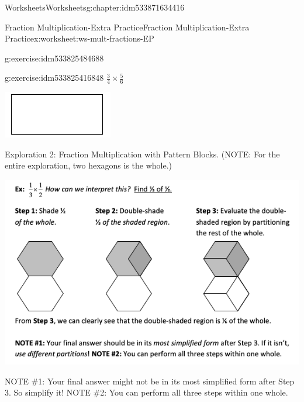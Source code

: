 \documentclass[twoside,11pt,]{book}
\begin{document}
\begin{chapterptx}{Worksheets}{}{Worksheets}{}{}{g:chapter:idm533871634416}
\begin{worksheet-section-numberless}{Fraction Multiplication-Extra Practice}{}{Fraction Multiplication-Extra Practice}{}{}{x:worksheet:ws-mult-fractions-EP}
\begin{divisionexercise}{1}{}{}{g:exercise:idm533825484688}
\begin{sidebyside}{1}{0.2}{0.2}{0}
\end{sidebyside}%
\end{divisionexercise}%
\clearpage
\begin{divisionexercise}{2}{}{}{g:exercise:idm533825416848}%
\(\frac{3}{4} \times \frac{5}{6} \)%
\begin{sidebyside}{1}{0.2}{0.2}{0}%
\begin{sbspanel}{0.6}%
\includegraphics[width=1\linewidth]{images/generic-rectangle.png}
\end{sbspanel}%
\end{sidebyside}%
\end{divisionexercise}%
\clearpage
\begin{introduction}{}%
Exploration 2: Fraction Multiplication with Pattern Blocks. (NOTE: For the entire exploration, two hexagons is the whole.)%
\begin{sidebyside}{1}{0}{0}{0}%
\begin{sbspanel}{1}%
\includegraphics[width=1\linewidth]{images/frac-mult-pattern.png}
\end{sbspanel}%
\end{sidebyside}%
\par
NOTE \#1: Your final answer might not be in its most simplified form after Step 3. So simplify it! NOTE \#2: You can perform all three steps within one whole.%

\end{introduction}
\end{worksheet-section-numberless}
\end{chapterptx}
\end{document}
